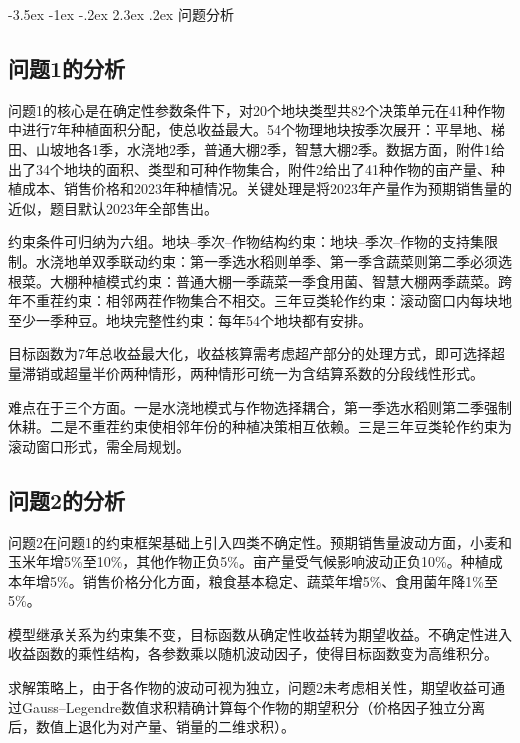 \documentclass[12pt,a4paper]{article}
\makeatletter
\renewcommand\section{\@startsection{section}{1}{\z@}%
  {-3.5ex \@plus -1ex \@minus -.2ex}%
  {2.3ex \@plus .2ex}%
  {\centering\normalfont\Large\bfseries}}
\makeatother
\begin{document}
\section{问题分析}

\subsection{问题1的分析}

问题1的核心是在确定性参数条件下，对20个地块类型共82个决策单元在41种作物中进行7年种植面积分配，使总收益最大。54个物理地块按季次展开：平旱地、梯田、山坡地各1季，水浇地2季，普通大棚2季，智慧大棚2季。数据方面，附件1给出了34个地块的面积、类型和可种作物集合，附件2给出了41种作物的亩产量、种植成本、销售价格和2023年种植情况。关键处理是将2023年产量作为预期销售量的近似，题目默认2023年全部售出。

约束条件可归纳为六组。地块--季次--作物结构约束：地块--季次--作物的支持集限制。水浇地单双季联动约束：第一季选水稻则单季、第一季含蔬菜则第二季必须选根菜。大棚种植模式约束：普通大棚一季蔬菜一季食用菌、智慧大棚两季蔬菜。跨年不重茬约束：相邻两茬作物集合不相交。三年豆类轮作约束：滚动窗口内每块地至少一季种豆。地块完整性约束：每年54个地块都有安排。

目标函数为7年总收益最大化，收益核算需考虑超产部分的处理方式，即可选择超量滞销或超量半价两种情形，两种情形可统一为含结算系数的分段线性形式。

难点在于三个方面。一是水浇地模式与作物选择耦合，第一季选水稻则第二季强制休耕。二是不重茬约束使相邻年份的种植决策相互依赖。三是三年豆类轮作约束为滚动窗口形式，需全局规划。

\subsection{问题2的分析}

问题2在问题1的约束框架基础上引入四类不确定性。预期销售量波动方面，小麦和玉米年增5\%至10\%，其他作物正负5\%。亩产量受气候影响波动正负10\%。种植成本年增5\%。销售价格分化方面，粮食基本稳定、蔬菜年增5\%、食用菌年降1\%至5\%。

模型继承关系为约束集不变，目标函数从确定性收益转为期望收益。不确定性进入收益函数的乘性结构，各参数乘以随机波动因子，使得目标函数变为高维积分。

求解策略上，由于各作物的波动可视为独立，问题2未考虑相关性，期望收益可通过Gauss--Legendre数值求积精确计算每个作物的期望积分（价格因子独立分离后，数值上退化为对产量、销量的二维求积）。
\end{document}
